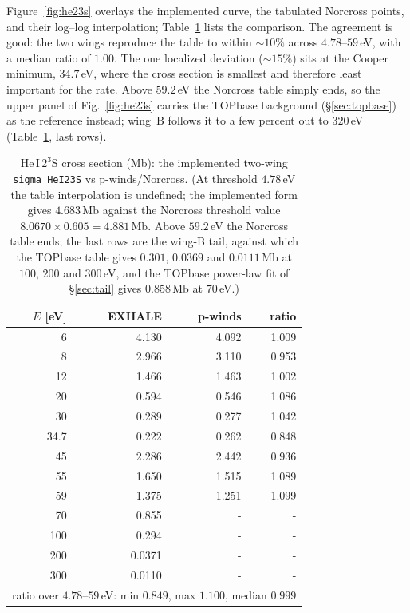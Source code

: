 \documentclass[english,a4paper]{my_memo}
\newcommand{\Mb}{\mathrm{Mb}}
\begin{document}
Figure~\ref{fig:he23s} overlays the implemented curve, the tabulated Norcross
points, and their log--log interpolation; Table~\ref{tab:he23s} lists the
comparison. The agreement is good: the two wings reproduce the table to within
$\sim$$10\%$ across $4.78$--$59\,$eV, with a median ratio of $1.00$. The one
localized deviation ($\sim$$15\%$) sits at the Cooper minimum, $34.7\,$eV,
where the cross section is smallest and therefore least important for the rate.
Above $59.2\,$eV the Norcross table simply ends, so the upper panel of
Fig.~\ref{fig:he23s} carries the TOPbase background (\S\ref{sec:topbase}) as
the reference instead; wing~B follows it to a few percent out to $320\,$eV
(Table~\ref{tab:he23s}, last rows).

\begin{table}[h]
\centering
\caption{He\,I\,$2^3$S cross section (Mb): the implemented two-wing
\texttt{sigma\_HeI23S} vs p-winds/Norcross. (At threshold $4.78\,$eV the table
interpolation is undefined; the implemented form gives $4.683\,\Mb$ against the
Norcross threshold value $8.0670\times0.605 = 4.881\,\Mb$. Above $59.2\,$eV the
Norcross table ends; the last rows are the wing-B tail, against which the
TOPbase table gives $0.301$, $0.0369$ and $0.0111\,\Mb$ at $100$, $200$ and
$300\,$eV, and the TOPbase power-law fit of \S\ref{sec:tail} gives
$0.858\,\Mb$ at $70\,$eV.)}
\label{tab:he23s}
\begin{tabular}{rrrr}
\toprule
$E$ [eV] & EXHALE & p-winds & ratio\\
\midrule
6    & 4.130 & 4.092 & 1.009\\
8    & 2.966 & 3.110 & 0.953\\
12   & 1.466 & 1.463 & 1.002\\
20   & 0.594 & 0.546 & 1.086\\
30   & 0.289 & 0.277 & 1.042\\
34.7 & 0.222 & 0.262 & 0.848\\
45   & 2.286 & 2.442 & 0.936\\
55   & 1.650 & 1.515 & 1.089\\
59   & 1.375 & 1.251 & 1.099\\
\midrule
70   & 0.855 & - & -\\
100  & 0.294 & - & -\\
200  & 0.0371& - & -\\
300  & 0.0110& - & -\\
\midrule
\multicolumn{4}{l}{ratio over $4.78$--$59\,$eV: min $0.849$, max $1.100$, median $0.999$}\\
\bottomrule
\end{tabular}
\end{table}
\end{document}
